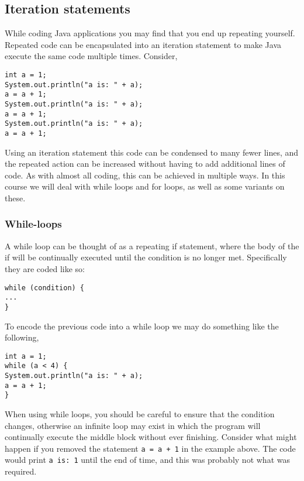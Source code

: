 \subsection{Iteration statements}

While coding Java applications you may find that you end up repeating yourself. Repeated code can be encapsulated into an iteration statement to make Java execute the same code multiple times. Consider,

\begin{verbatim}
int a = 1;
System.out.println("a is: " + a);
a = a + 1;
System.out.println("a is: " + a);
a = a + 1;
System.out.println("a is: " + a);
a = a + 1;
\end{verbatim}

\noindent
Using an iteration statement this code can be condensed to many fewer lines, and the repeated action can be increased without having to add additional lines of code. As with almost all coding, this can be achieved in multiple ways. In this course we will deal with while loops and for loops, as well as some variants on these.

\subsubsection*{While-loops}

A while loop can be thought of as a repeating if statement, where the body of the if will be continually executed until the condition is no longer met. Specifically they are coded like so:

\begin{verbatim}
while (condition) {
...
}
\end{verbatim}

\noindent
To encode the previous code into a while loop we may do something like the following,

\begin{verbatim}
int a = 1;
while (a < 4) {
System.out.println("a is: " + a);
a = a + 1;
}
\end{verbatim}

\noindent
When using while loops, you should be careful to ensure that the condition changes, otherwise an infinite loop may exist in which the program will continually execute the middle block without ever finishing. Consider what might happen if you removed the statement {\tt a = a + 1} in the example above. The code would print {\tt a is: 1} until the end of time, and this was probably not what was required.\\

